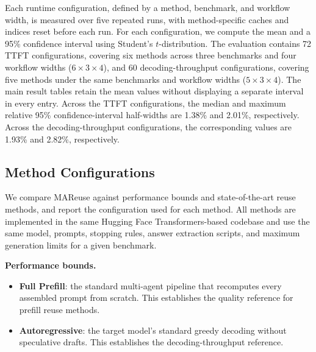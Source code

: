 \documentclass[letterpaper]{article} %
\begin{document}
Each runtime configuration, defined by a method, benchmark, and workflow width, is measured over five repeated runs, with method-specific caches and indices reset before each run. For each configuration, we compute the mean and a 95\% confidence interval using Student's $t$-distribution. The evaluation contains 72 TTFT configurations, covering six methods across three benchmarks and four workflow widths ($6\times3\times4$), and 60 decoding-throughput configurations, covering five methods under the same benchmarks and workflow widths ($5\times3\times4$). The main result tables retain the mean values without displaying a separate interval in every entry. Across the TTFT configurations, the median and maximum relative 95\% confidence-interval half-widths are 1.38\% and 2.01\%, respectively. Across the decoding-throughput configurations, the corresponding values are 1.93\% and 2.82\%, respectively.

\subsection{Method Configurations}

We compare MAReuse against performance bounds and state-of-the-art reuse methods, and report the configuration used for each method. All methods are implemented in the same Hugging Face Transformers-based codebase and use the same model, prompts, stopping rules, answer extraction scripts, and maximum generation limits for a given benchmark.

\noindent\textbf{Performance bounds.}
\begin{itemize}
    \item \textbf{Full Prefill}: the standard multi-agent pipeline that recomputes every assembled prompt from scratch. This establishes the quality reference for prefill reuse methods.
    \item \textbf{Autoregressive}: the target model's standard greedy decoding without speculative drafts. This establishes the decoding-throughput reference.
\end{itemize}
\end{document}

